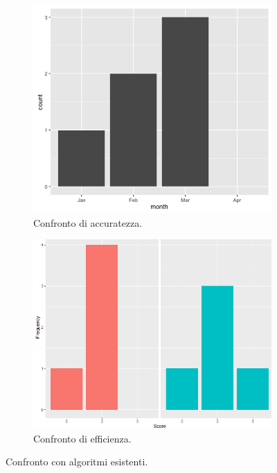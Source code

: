 \begin{figure}[htbp]
    \centering
    \begin{subfigure}{0.45\textwidth}
        \centering
        \includegraphics[width=\textwidth]{immagini/placeholder-graph-1.png}
        \caption{Confronto di accuratezza.}
        \label{fig:confronto-accuratezza}
    \end{subfigure}
    \hfill
    \begin{subfigure}{0.45\textwidth}
        \centering
        \includegraphics[width=\textwidth]{immagini/placeholder-graph-2.png}
        \caption{Confronto di efficienza.}
        \label{fig:confronto-efficienza}
    \end{subfigure}
    \caption{Confronto con algoritmi esistenti.}
    \label{fig:confronto-completo}
\end{figure}

